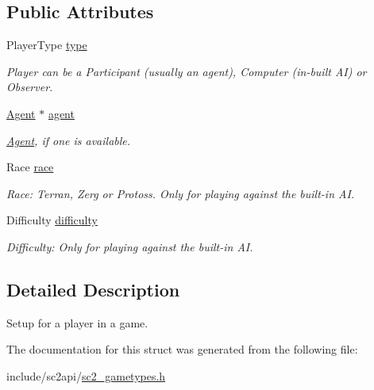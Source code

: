 \subsection*{Public Attributes}
\begin{DoxyCompactItemize}
\item 
\mbox{\label{structsc2_1_1_player_setup_a59ec60d77794e16f2325a4bdbc693d89}} 
Player\+Type \hyperlink{structsc2_1_1_player_setup_a59ec60d77794e16f2325a4bdbc693d89}{type}
\begin{DoxyCompactList}\small\item\em Player can be a Participant (usually an agent), Computer (in-\/built AI) or Observer. \end{DoxyCompactList}\item 
\mbox{\label{structsc2_1_1_player_setup_a46fd53bd97da279d423345b454823f2e}} 
\hyperlink{classsc2_1_1_agent}{Agent} $\ast$ \hyperlink{structsc2_1_1_player_setup_a46fd53bd97da279d423345b454823f2e}{agent}
\begin{DoxyCompactList}\small\item\em \hyperlink{classsc2_1_1_agent}{Agent}, if one is available. \end{DoxyCompactList}\item 
\mbox{\label{structsc2_1_1_player_setup_aaa5c79519707f78fbe6f9f6d3580a051}} 
Race \hyperlink{structsc2_1_1_player_setup_aaa5c79519707f78fbe6f9f6d3580a051}{race}
\begin{DoxyCompactList}\small\item\em Race\+: Terran, Zerg or Protoss. Only for playing against the built-\/in AI. \end{DoxyCompactList}\item 
\mbox{\label{structsc2_1_1_player_setup_ac9616c686e3e31c2d8f9f023c9cd7dca}} 
Difficulty \hyperlink{structsc2_1_1_player_setup_ac9616c686e3e31c2d8f9f023c9cd7dca}{difficulty}
\begin{DoxyCompactList}\small\item\em Difficulty\+: Only for playing against the built-\/in AI. \end{DoxyCompactList}\end{DoxyCompactItemize}


\subsection{Detailed Description}
Setup for a player in a game. 

The documentation for this struct was generated from the following file\+:\begin{DoxyCompactItemize}
\item 
include/sc2api/\hyperlink{sc2__gametypes_8h}{sc2\+\_\+gametypes.\+h}\end{DoxyCompactItemize}
